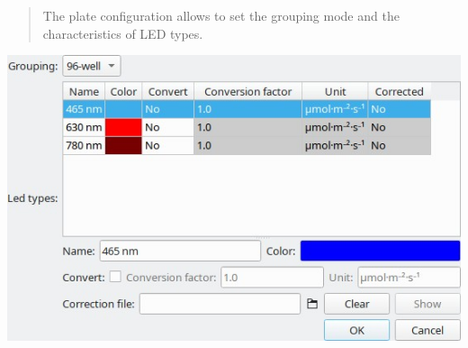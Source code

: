 \begin{quote}
The plate configuration allows to set the grouping mode and the
characteristics of LED types.
\end{quote}

\includegraphics{images/plate_config.jpg}

